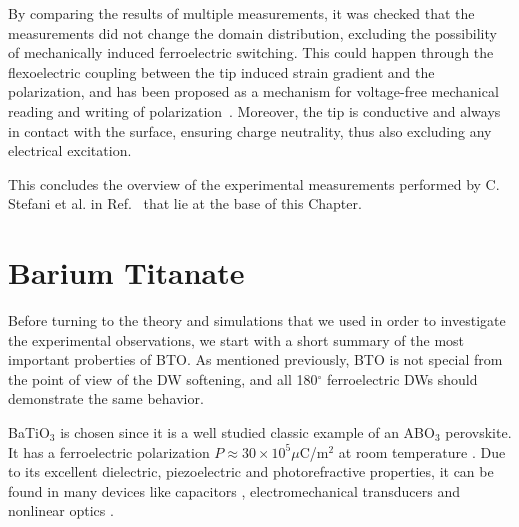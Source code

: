 By comparing the results of multiple measurements, it was checked that the measurements did not change the domain distribution, excluding the possibility of mechanically induced ferroelectric switching.
This could happen through the flexoelectric coupling between the tip induced strain gradient and the polarization, and has been proposed as a mechanism for voltage-free mechanical reading and writing of polarization~\cite{Cordero-Edwards2017,Cordero-Edwards2019,Abdollahi2015}.
Moreover, the tip is conductive and always in contact with the surface, ensuring charge neutrality, thus also excluding any electrical excitation.

This concludes the overview of the experimental measurements performed by C. Stefani et al. in Ref.~\cite{Stefani2020} that lie at the base of this Chapter.

\section{Barium Titanate}
Before turning to the theory and simulations that we used in order to investigate the experimental observations, we start with a short summary of the most important proberties of BTO.
As mentioned previously, BTO is not special from the point of view of the DW softening, and all 180$^\circ$ ferroelectric DWs should demonstrate the same behavior.

BaTiO$_3$ is chosen since it is a well studied classic example of an ABO$_3$ perovskite.
It has a ferroelectric polarization $P \approx 30 \times 10^5 \mu $C/m$^2$ at room temperature \cite{Mason1948, VonHippel1950, Ghosez1994}.
Due to its excellent dielectric, piezoelectric and photorefractive properties, it can be found in many devices like capacitors \cite{American1963}, electromechanical transducers \cite{Schofield1957} and nonlinear optics \cite{Ramakanth2015}.


